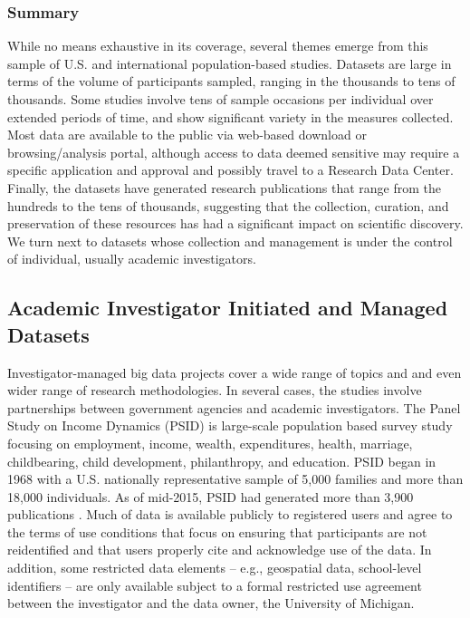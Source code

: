 \documentclass[letterpaper,man,apacite]{apa6}
\begin{document}
\subsubsection{Summary}

While no means exhaustive in its coverage, several themes emerge from this sample of U.S. and international population-based studies.
Datasets are large in terms of the volume of participants sampled, ranging in the thousands to tens of thousands.
Some studies involve tens of sample occasions per individual over extended periods of time, and show significant variety in the measures collected.
Most data are available to the public via web-based download or browsing/analysis portal, although access to data deemed sensitive may require a specific application and approval and possibly travel to a Research Data Center.
Finally, the datasets have generated research publications that range from the hundreds to the tens of thousands, suggesting that the collection, curation, and preservation of these resources has had a significant impact on scientific discovery.
We turn next to datasets whose collection and management is under the control of individual, usually academic investigators.

\subsection{Academic Investigator Initiated and Managed Datasets}

Investigator-managed big data projects cover a wide range of topics and and even wider range of research methodologies.
In several cases, the studies involve partnerships between government agencies and academic investigators.
The Panel Study on Income Dynamics (PSID) \cite{PSID} is large-scale population based survey study focusing on employment, income, wealth, expenditures, health, marriage, childbearing, child development, philanthropy, and education.
PSID began in 1968 with a U.S. nationally representative sample of 5,000 families and more than 18,000 individuals.
As of mid-2015, PSID had generated more than 3,900 publications \cite{PSID_pubs}. 
Much of data is available publicly to registered users and agree to the terms of use conditions \cite{PSID_term} that focus on ensuring that participants are not reidentified and that users properly cite and acknowledge use of the data. 
In addition, some restricted data elements -- e.g., geospatial data, school-level identifiers -- are only available subject to a formal restricted use agreement \cite{PSID_restricted_use} between the investigator and the data owner, the University of Michigan.
\end{document}
